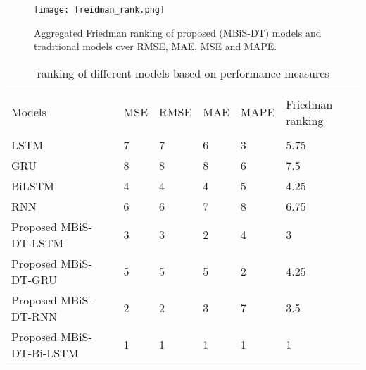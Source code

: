 \begin{figure}[ht!]
\centering
\texttt{[image: freidman\_rank.png]}
\caption{Aggregated Friedman ranking of proposed (MBiS-DT) models and traditional models over RMSE, MAE, MSE and MAPE.}
\label{fig:FriedmanPic}
\end{figure}

\begin{table}[ht!]

    \setlength{\tabcolsep}{3pt}
    {\renewcommand{\arraystretch}{1}%
\caption{ranking of different models based on performance measures}
\label{tabfri}
\begin{tabular}{l|lllll}
\hline
\\
Models& MSE & RMSE & MAE & MAPE & Friedman ranking\\
\hline
\\
LSTM & 7 & 7 & 6 & 3 & 5.75 \\
GRU & 8 & 8 & 8 & 6 &7.5 \\
BiLSTM & 4 & 4 & 4 & 5 &4.25 \\
RNN & 6 & 6 & 7 & 8 &6.75 \\
Proposed MBiS-DT-LSTM & 3 & 3 & 2 & 4 & 3 \\
Proposed MBiS-DT-GRU & 5 & 5 & 5 & 2 &4.25 \\
Proposed MBiS-DT-RNN & 2 & 2 & 3 & 7 &3.5 \\
Proposed MBiS-DT-Bi-LSTM & 1 & 1 & 1 & 1 &1 \\ \hline
\end{tabular}%
    }

\end{table}


